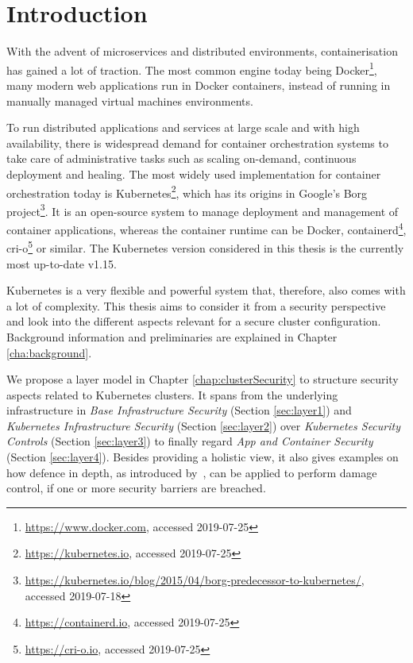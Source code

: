 
\chapter{Introduction}


With the advent of microservices and distributed environments, containerisation has gained a lot of traction. The most common engine today being Docker\footnote{\url{https://www.docker.com}, accessed 2019-07-25}, many modern web applications run in Docker containers, instead of running in manually managed virtual machines environments. 

To run distributed applications and services at large scale and with high availability, there is widespread demand for container orchestration systems to take care of administrative tasks such as scaling on-demand, continuous deployment and healing. The most widely used implementation for container orchestration today is Kubernetes\footnote{\url{https://kubernetes.io}, accessed 2019-07-25}, which has its origins in Google’s Borg project\footnote{\url{https://kubernetes.io/blog/2015/04/borg-predecessor-to-kubernetes/}, accessed 2019-07-18}. It is an open-source system to manage deployment and management of container applications, whereas the container runtime can be Docker, containerd\footnote{\url{https://containerd.io}, accessed 2019-07-25}, cri-o\footnote{\url{https://cri-o.io}, accessed 2019-07-25} or similar. The Kubernetes version considered in this thesis is the currently most up-to-date v1.15.

Kubernetes is a very flexible and powerful system that, therefore, also comes with a lot of complexity. This thesis aims to consider it from a security perspective and look into the different aspects relevant for a secure cluster configuration. Background information and preliminaries are explained in Chapter \ref{cha:background}.

We propose a layer model in Chapter \ref{chap:clusterSecurity} to structure security aspects related to Kubernetes clusters. It spans from the underlying infrastructure in \textit{Base Infrastructure Security} (Section \ref{sec:layer1}) and \textit{Kubernetes Infrastructure Security} (Section \ref{sec:layer2}) over \textit{Kubernetes Security Controls} (Section \ref{sec:layer3}) to finally regard \textit{App and Container Security} (Section \ref{sec:layer4}). Besides providing a holistic view, it also gives examples on how defence in depth, as introduced by~\textcite{defenceInDepth}, can be applied to perform damage control, if one or more security barriers are breached.

